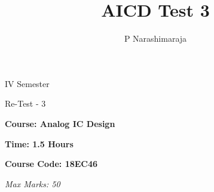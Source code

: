 \documentclass[dvipsnames]{rvexam}
\title{AICD Test 3}
\author{P Narashimaraja }
\newif\ifsee \seefalse
\gdef\courseTitle{Analog IC Design}
\gdef\courseCode{18EC46}
\gdef\sem{IV}
\gdef\testTitle{Re-Test - 3} \fi
\begin{document}
\ifsee{
}\else{
\begin{center}
\sem\; Semester  \par
\testTitle   \par
\end{center}

\begin{minipage}[t]{10cm}
\flushleft
\textbf{Course: \courseTitle}\par
\textbf{Time: 1.5 Hours} \par
\end{minipage}
\hfill
\begin{minipage}[t]{5cm}
\flushright
\textbf{Course Code: \courseCode}\par
\textit{Max Marks: 50}
\end{minipage}
}
\fi
\vspace{0.2cm}
\vspace{2mm}
\end{document}
